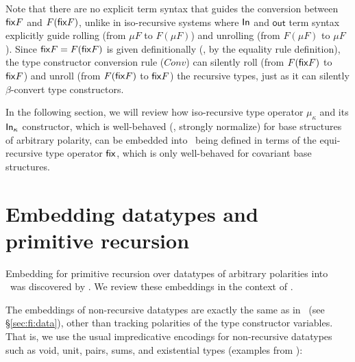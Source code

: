 Note that there are no explicit term syntax that guides the conversion between
$\mathsf{fix} F$ and $F(\mathsf{fix} F)$, unlike in iso-recursive systems where $\mathsf{In}$ and
$\mathsf{out}$ term syntax explicitly guide rolling (from $\mu F$ to $F(\mu F)$)
and unrolling (from $F(\mu F)$ to $\mu F$). Since $\mathsf{fix} F=F(\mathsf{fix} F)$ is given
definitionally (\ie, by the equality rule definition), the type constructor
conversion rule ($Conv$) can silently roll (from $F(\mathsf{fix} F)$ to $\mathsf{fix} F$) and
unroll (from $F(\mathsf{fix} F)$ to $\mathsf{fix} F$) the recursive types, just as it can
silently $\beta$-convert type constructors.

In the following section, we will review how iso-recursive type operator
$\mu_\kappa$ and its $\mathsf{In}_\kappa$ constructor, which is well-behaved
(\ie, strongly normalize) for base structures of arbitrary polarity,
can be embedded into \Fixi\ being defined in terms of the equi-recursive
type operator $\mathsf{fix}$, which is only well-behaved for covariant base structures.

\section{Embedding datatypes and primitive recursion}
\label{sec:fixi:data}
Embedding for primitive recursion over datatypes of arbitrary polarities into
\Fixi\ was discovered by \citet{AbeMat04}. We review these embeddings
in the context of \Fixi.

The embeddings of non-recursive datatypes are exactly the same as in \Fi\ (see
\S\ref{sec:fi:data}), other than tracking polarities of the type constructor
variables. That is, we use the usual impredicative encodings for non-recursive
datatypes such as void, unit, pairs, sums, and existential types
(examples from \citet{AbeMat04}):

